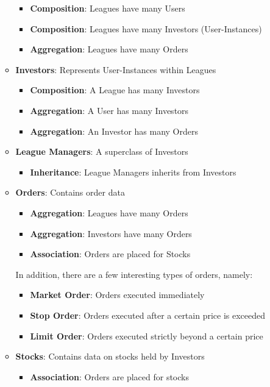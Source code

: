\begin{itemize}
\begin{itemize}
		\begin{itemize}
		\item \textbf{Composition}: Leagues have many Users
		\item \textbf{Composition}: Leagues have many Investors (User-Instances)
		\item \textbf{Aggregation}: Leagues have many Orders
		\end{itemize}
	\item \textbf{Investors}: Represents User-Instances within Leagues
		\begin{itemize}
		\item \textbf{Composition}: A League has many Investors
		\item \textbf{Aggregation}: A User has many Investors
		\item \textbf{Aggregation}: An Investor has many Orders
		\end{itemize}
	\item \textbf{League Managers}: A superclass of Investors
		\begin{itemize}
		\item \textbf{Inheritance}: League Managers inherits from Investors
		\end{itemize}	
	\item \textbf{Orders}: Contains order data
		\begin{itemize}
		\item \textbf{Aggregation}: Leagues have many Orders
		\item \textbf{Aggregation}: Investors have many Orders
		\item \textbf{Association}: Orders are placed for Stocks
		\end{itemize}
	
		In addition, there are a few interesting types of orders, namely:
		\begin{itemize}
		\item \textbf{Market Order}: Orders executed immediately
		\item \textbf{Stop Order}: Orders executed after a certain price is exceeded
		\item \textbf{Limit Order}: Orders executed strictly beyond a certain price
		\end{itemize}
	\item \textbf{Stocks}: Contains data on stocks held by Investors
		\begin{itemize}
		\item \textbf{Association}: Orders are placed for stocks
		\end{itemize}
	\end{itemize}
\end{itemize}


